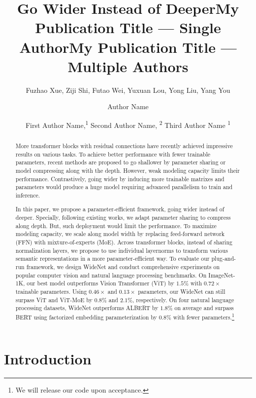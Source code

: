 \documentclass[letterpaper]{article} \usepackage{aaai22}  \usepackage{times}  \usepackage{helvet}  \usepackage{courier}  \usepackage[hyphens]{url}  \usepackage{graphicx} \urlstyle{rm} \def\UrlFont{\rm}  \usepackage{natbib}  \usepackage{caption} \DeclareCaptionStyle{ruled}{labelfont=normalfont,labelsep=colon,strut=off} \frenchspacing  \setlength{\pdfpagewidth}{8.5in}  \setlength{\pdfpageheight}{11in}  \usepackage{algorithm}
\title{Go Wider Instead of Deeper}
\author{
    Fuzhao Xue, 
        Ziji Shi,
        Futao Wei,
        Yuxuan Lou, 
        Yong Liu, 
        Yang You \\
}
\title{My Publication Title --- Single Author}
\author {
    Author Name
}
\title{My Publication Title --- Multiple Authors}
\author {
First Author Name,\textsuperscript{\rm 1}
    Second Author Name, \textsuperscript{\rm 2}
    Third Author Name \textsuperscript{\rm 1}
}
\begin{document}
\maketitle

\begin{abstract}
More transformer blocks with residual connections have recently achieved impressive results on various tasks. To achieve better performance with fewer trainable parameters, recent methods are proposed to go shallower by parameter sharing or model compressing along with the depth. However, weak modeling capacity limits their performance. Contrastively, going wider by inducing more trainable matrixes and parameters would produce a huge model requiring advanced parallelism to train and inference.  


In this paper, we propose a parameter-efficient framework, going wider instead of deeper. Specially, following existing works, we adapt parameter sharing to compress along depth. But, such deployment would limit the performance. To maximize modeling capacity, we scale along model width by replacing feed-forward network (FFN) with mixture-of-experts (MoE). Across transformer blocks, instead of sharing normalization layers, we propose to use individual layernorms to transform various semantic representations in a more parameter-efficient way. To evaluate our plug-and-run framework, we design WideNet and conduct comprehensive experiments on popular computer vision and natural language processing benchmarks. On ImageNet-1K, our best model outperforms Vision Transformer (ViT) by $1.5\%$ with $0.72 \times$ trainable parameters. Using $0.46 \times$ and $0.13 \times$  parameters, our WideNet can still surpass ViT and ViT-MoE by $0.8\%$ and $2.1\%$, respectively. On four natural language processing datasets, WideNet outperforms ALBERT by $1.8\%$ on average and surpass BERT using factorized embedding parameterization by $0.8\%$ with fewer parameters.\footnote{We will release our code upon acceptance.}

\end{abstract}

\section{Introduction}
\label{sec:intro}
\end{document}
